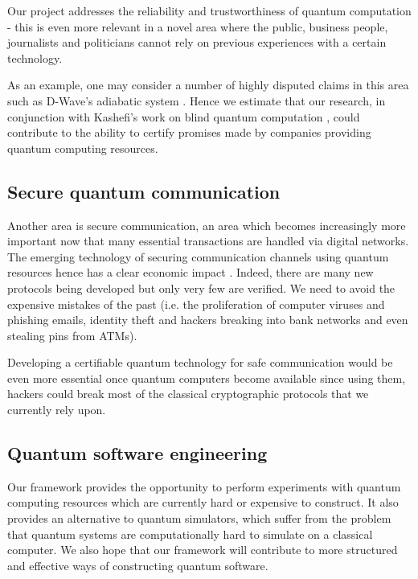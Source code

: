 \documentclass[a4paper]{article}
\begin{document}
Our project addresses the reliability and
trustworthiness of quantum computation - this is even more relevant in
a novel area where the public, business people, journalists and
politicians cannot rely on previous experiences with a certain
technology. 

As an example, one may consider a number of highly
disputed claims in this area such as D-Wave's adiabatic system
\cite{dwave}. Hence we estimate that our research, in conjunction with
Kashefi's work on blind quantum computation \cite{blind,blind2}, 
could contribute to the ability to certify promises made by companies
providing quantum computing resources.


\subsection*{Secure quantum communication}
\label{sec:secure-quant-comm}

Another area is secure communication, an area which becomes
increasingly more important now that many essential transactions are
handled via digital networks. The emerging technology of securing
communication channels using quantum resources hence has a clear
economic impact \cite{qci}. Indeed, there are many
new protocols being developed but only very few are verified. We need
to avoid the expensive mistakes of the past (i.e. the proliferation of
computer viruses and phishing emails, identity theft and hackers
breaking into bank networks and even stealing pins from ATMs).

Developing a certifiable quantum technology for safe communication
would be even more essential once quantum computers become available
since using them, hackers could break most of the classical
cryptographic protocols that we currently rely upon.

\subsection*{Quantum software engineering}
\label{sec:quant-softw-engin}

Our framework provides the opportunity to perform experiments with
quantum computing resources which are currently hard or expensive to
construct. It also provides an alternative to quantum simulators, which
suffer from the problem that quantum systems are computationally hard
to simulate on a classical computer. We also hope that our framework
will contribute to more structured and effective ways of constructing
quantum software. 
\end{document}
